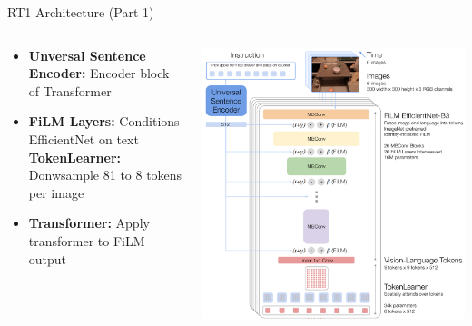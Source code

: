 \documentclass{beamer}
\begin{document}
\begin{frame}[t]{RT1 Architecture (Part 1)}
    \begin{columns}
        \hspace{1em}
		\begin{column}{.5\textwidth}
            \begin{itemize}[label=-]
                \item  \textbf{Unversal Sentence Encoder:} Encoder block of Transformer\newline
                \item \textbf{FiLM Layers:} Conditions EfficientNet on text\newline
                \textbf{TokenLearner:} Donwsample 81 to 8 tokens per image \newline
                \item \textbf{Transformer:} Apply transformer to FiLM output\newline
            \end{itemize}
		\end{column}
        \hspace{0em}
		\begin{column}{.5\textwidth}
            \begin{center}
                \includegraphics[width=1.0\textwidth]{./img/rt1_arch.png}
            \end{center}
		\end{column}
	\end{columns}
\end{frame}
\end{document}

